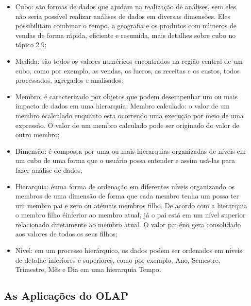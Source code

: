 \begin{itemize}

    \item Cubo: s\~{a}o formas de dados que ajudam na realiza\c{c}\~{a}o de an\'{a}lises, sem eles n\~{a}o seria poss\'{i}vel realizar an\'{a}lises de dados em diversas dimens\~{o}es. Eles possibilitam combinar o tempo, a geografia e os produtos com números de vendas de forma r\'{a}pida, eficiente e resumida, mais detalhes sobre cubo no t\'{o}pico 2.9;
    
    \item Medida: s\~{a}o todos os valores num\'{e}ricos encontrados na regi\~{a}o central de um cubo, como por exemplo, as vendas, os lucros, as receitas e os custos, todos processados, agregados e analisados;
    
    \item Membro: \'{e} caracterizado por objetos que podem desempenhar um ou mais impacto de dados em uma hierarquia;
    Membro calculado: o valor de um membro \'{e}calculado enquanto esta ocorrendo uma execu\c{c}\~{a}o por meio de uma express\~{a}o. O valor de um membro calculado pode ser originado do valor de outro membro;
    
    \item Dimens\~{a}o: \'{e} composta por uma ou mais hierarquias organizadas de n\'{i}veis em um cubo de uma forma que o usu\'{a}rio possa entender e assim us\'{a}-las para fazer an\'{a}lise de dados;
    
    \item Hierarquia: \'{e}uma forma de ordena\c{c}\~{a}o em diferentes n\'{i}veis organizando os membros de uma dimens\~{a}o de forma que cada membro tenha um possa ter um membro pai e zero ou at\'{e}mais membros filho. De acordo com a hierarquia o membro filho \'{e}inferior ao membro atual, j\'{a} o pai est\'{a} em um n\'{i}vel superior relacionado diretamente ao membro atual. O valor pai \'{e}no gera consolidado aos valores de todos os seus filhos;
    
    \item N\'{i}vel: em um processo hier\'{a}rquico, os dados podem ser ordenados em n\'{i}veis de detalhe inferiores e superiores, como por exemplo, Ano, Semestre, Trimestre, Mês e Dia em uma hierarquia Tempo.

\end{itemize}

\subsection{As Aplica\c{c}\~{o}es do OLAP}

